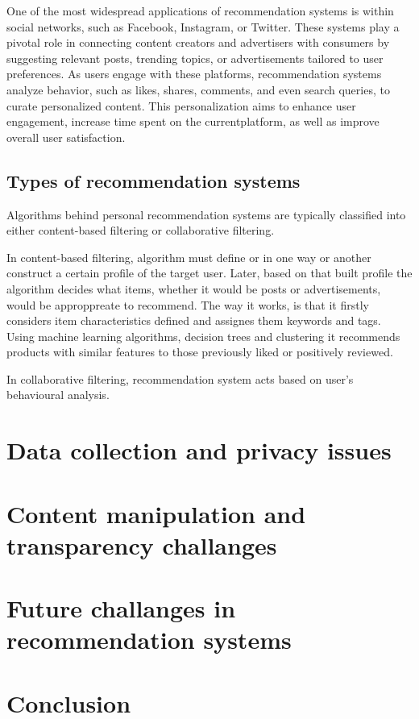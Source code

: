 \documentclass[10pt,twocolumn,twoside,a4paper]{report} %
\begin{document}
One of the most widespread applications of recommendation systems is within social networks, such as Facebook, Instagram, or Twitter.
These systems play a pivotal role in connecting content creators and advertisers with consumers by suggesting relevant posts, trending topics,
or advertisements tailored to user preferences.
As users engage with these platforms, recommendation systems analyze behavior, such as likes, shares, comments, and even search queries,
to curate personalized content. This personalization aims to enhance user engagement, increase time spent on the currentplatform,
as well as improve overall user satisfaction.

\subsection{Types of recommendation systems}
Algorithms behind personal recommendation systems are typically classified into either content-based filtering or collaborative filtering. \cite{raghavendra2018personalized}

In content-based filtering, algorithm must define or in one way or another construct a certain profile of the target user. Later, based on that
built profile the algorithm decides what items, whether it would be posts or advertisements, would be approppreate to recommend.
The way it works, is that it firstly considers item characteristics defined and assignes them keywords and tags. Using machine learning algorithms,
decision trees and clustering it recommends products with similar features to those previously liked or positively reviewed. \cite{raghavendra2018personalized}\cite{contentvscollaborative}

In collaborative filtering, recommendation system acts based on user's behavioural analysis. 

\section{Data collection and privacy issues} \label{data_issues}
\section{Content manipulation and transparency challanges} \label{content_manipulation}
\section{Future challanges in recommendation systems} \label{content_manipulation}

\section{Conclusion} \label{conclusion}



\end{document}
